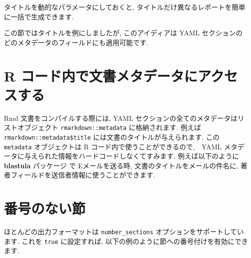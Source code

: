 \documentclass[
  11pt,
  lualatex,ja=standard,jafont=noto]{bxjsreport}
\newenvironment{Shaded}{\begin{snugshade}}{\end{snugshade}}
\newcommand{\AnnotationTok}[1]{\textcolor[rgb]{0.56,0.35,0.01}{\textbf{\textit{#1}}}}
\newcommand{\CommentTok}[1]{\textcolor[rgb]{0.56,0.35,0.01}{\textit{#1}}}
\newcommand{\InformationTok}[1]{\textcolor[rgb]{0.56,0.35,0.01}{\textbf{\textit{#1}}}}
\newcommand{\NormalTok}[1]{#1}
\begin{document}
タイトルを動的なパラメータにしておくと, タイトルだけ異なるレポートを簡単に一括で生成できます.

この節ではタイトルを例にしましたが, このアイディアは YAML セクションのどのメタデータのフィールドにも適用可能です.

\hypertarget{document-metadata}{%
\section{R コード内で文書メタデータにアクセスする}\label{document-metadata}}

Rmd 文書をコンパイルする際には, YAML セクションの全てのメタデータはリストオブジェクト \texttt{rmarkdown::metadata} に格納されます. 例えば \texttt{rmarkdown::metadata\$title} には文書のタイトルが与えられます. この \texttt{metadata} オブジェクトは R コード内で使うことができるので,　YAML メタデータに与えられた情報をハードコードしなくてすみます. 例えば以下のように \textbf{blastula} パッケージ \autocite{R-blastula} で Eメールを送る時, 文書のタイトルをメールの件名に, 著者フィールドを送信者情報に使うことができます.

\begin{Shaded}
\end{Shaded}

\hypertarget{unnumbered-sections}{%
\section{番号のない節}\label{unnumbered-sections}}

ほとんどの出力フォーマットは \texttt{number\_sections} オプションをサポートしています. これを \texttt{true} に設定すれば, 以下の例のように節への番号付けを有効にできます.
\end{document}

